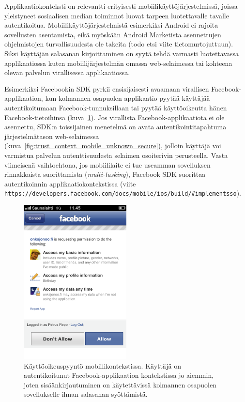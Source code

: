 \documentclass[finnish,gradu]{tktltiki}
\begin{document}
  Applikaatiokonteksti on relevantti erityisesti mobiilikäyttöjärjestelmissä, joissa yleistyneet sosiaalisen median toiminnot luovat tarpeen luotettavalle tavalle autentikoitua. Mobiilikäyttöjärjestelmistä esimerkiksi Android ei rajoita sovellusten asentamista, eikä myöskään Android Marketista asennettujen ohjelmistojen turvallisuudesta ole takeita (todo etsi viite tietomurtojuttuun). Siksi käyttäjän salasanan kirjoittaminen on syytä tehdä varmasti luotettavassa applikaatiossa kuten mobiilijärjestelmän omassa web-selaimessa tai kohteena olevan palvelun virallisessa applikaatiossa.

  Esimerkiksi Facebookin SDK pyrkii ensisijaisesti avaamaan virallisen Facebook-applikaation, kun kolmannen osapuolen applikaatio pyytää käyttäjää autentikoitumaan Facebook-tunnuksillaan tai pyytää käyttöoikeutta hänen Facebook-tietoihinsa (kuva~\ref{fig:trust_context_mobile_fb}). Jos virallista Facebook-applikaatiota ei ole asennettu, SDK:n toissijainen menetelmä on avata autentikointitapahtuma järjestelmätason web-selaimessa (kuva~\ref{fig:trust_context_mobile_unknown_secure}), jolloin käyttäjä voi varmistua palvelun autenttisuudesta selaimen osoiterivin perusteella. Vasta viimeisenä vaihtoehtona, jos mobiililaite ei tue useamman sovelluksen rinnakkaista suorittamista (\emph{multi-tasking}), Facebook SDK suorittaa autentikoinnin applikaatiokontekstissa (viite \verb=https://developers.facebook.com/docs/mobile/ios/build/#implementsso=).

  \begin{figure}
    \centering
    \includegraphics[width=0.5\textwidth]{images/trust_context_mobile_fb.png}
    \caption{Käyttöoikeuspyyntö mobiilikontekstissa. Käyttäjä on autentikoitunut Facebook-applikaation kontekstissa jo aiemmin, joten sisäänkirjautuminen on käytettävissä kolmannen osapuolen sovellukselle ilman salasanan syöttämistä.}
    \label{fig:trust_context_mobile_fb}
  \end{figure}
\end{document}
